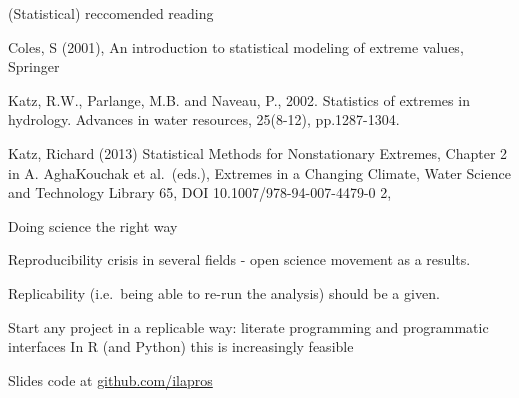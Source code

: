 \documentclass[
  10pt,
  ignorenonframetext,
  compress]{beamer}
\begin{document}
\begin{frame}{(Statistical) reccomended reading}
\protect\hypertarget{statistical-reccomended-reading}{}

Coles, S (2001), An introduction to statistical modeling of extreme
values, Springer

Katz, R.W., Parlange, M.B. and Naveau, P., 2002. Statistics of extremes
in hydrology. Advances in water resources, 25(8-12), pp.1287-1304.

Katz, Richard (2013) Statistical Methods for Nonstationary Extremes,
Chapter 2 in A. AghaKouchak et al.~(eds.), Extremes in a Changing
Climate, Water Science and Technology Library 65, DOI
10.1007/978-94-007-4479-0 2,

\end{frame}

\begin{frame}{Doing science the right way}
\protect\hypertarget{doing-science-the-right-way}{}

Reproducibility crisis in several fields - open science movement as a
results.

Replicability (i.e.~being able to re-run the analysis) should be a
given.

Start any project in a replicable way: literate programming and
programmatic interfaces In R (and Python) this is increasingly feasible

Slides code at
\href{https://github.com/ilapros/PerugiaSummerSchool/tree/master/July2020}{github.com/ilapros}

\end{frame}
\end{document}
